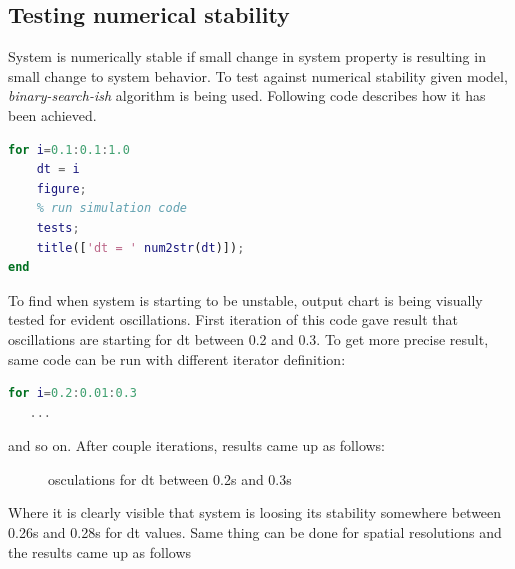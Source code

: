\documentclass[onecolumn]{article}
\begin{document}
\subsection{Testing numerical stability}
System is numerically stable if small change in system property is resulting in small change to system behavior.
To test against numerical stability given model, \textit{binary-search-ish} algorithm is being used. Following code describes how it has been achieved.
\begin{lstlisting}[language=Matlab,frame=single,label={lst:autocorr},breaklines=true,caption={finding numerical stability point}]
% test for different dt values from 0.1 to 1.0
for i=0.1:0.1:1.0
    dt = i
    figure;
    % run simulation code
    tests;
    title(['dt = ' num2str(dt)]);
end
\end{lstlisting}
To find when system is starting to be unstable, output chart is being visually tested for evident oscillations. First iteration of this code gave result that oscillations are starting for dt between 0.2 and 0.3. To get more precise result, same code can be run with different iterator definition:
\begin{lstlisting}[language=Matlab,frame=single,label={lst:autocorr},breaklines=true,caption={iteration example}]
for i=0.2:0.01:0.3
   ...
\end{lstlisting}
and so on. After couple iterations, results came up as follows:
\begin{figure}[H]
\noindent{}
\caption{osculations for dt between 0.2s and 0.3s}
\label{fig:plate}
\end{figure}
Where it is clearly visible that system is loosing its stability somewhere between 0.26s and 0.28s for dt values.
Same thing can be done for spatial resolutions and the results came up as follows
\end{document}
